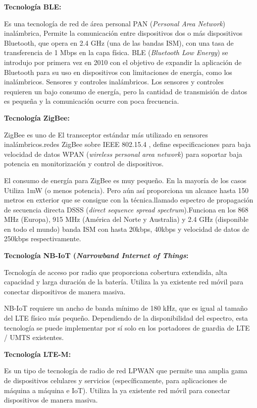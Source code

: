 \textbf{Tecnología BLE:}

Es una tecnología de red de área personal PAN (\textit{Personal Area Network}) inalámbrica, Permite la comunicación entre dispositivos dos o  más dispositivos Bluetooth, que opera en 2.4 GHz (una de las bandas ISM), con una tasa de transferencia de 1 Mbps en la capa física. BLE (\textit{Bluetooth Low Energy}) se introdujo por primera vez en 2010 con el objetivo de expandir la aplicación de Bluetooth para su uso en dispositivos con limitaciones de energía, como los inalámbricos. Sensores y controles inalámbricos. Los sensores y controles requieren un bajo consumo de energía, pero la cantidad de transmisión de datos es pequeña y la comunicación ocurre con poca frecuencia\citep{chang2014bluetooth}.


\textbf{Tecnología ZigBee:}

ZigBee es uno de El transceptor estándar más utilizado en sensores inalámbricos.redes ZigBee sobre IEEE 802.15.4 , define especificaciones para baja velocidad de datos WPAN (\textit{wireless personal area network}) para soportar baja potencia en monitorización y control de dispositivos\citep{ramya2011study}.

El consumo de energía para ZigBee es muy pequeño. En la mayoría de los casos Utiliza 1mW (o menos potencia). Pero aún así proporciona un alcance hasta 150 metros en exterior que se consigue con la técnica.llamado espectro de propagación de secuencia directa DSSS (\textit{direct sequence spread spectrum}).Funciona en los 868 MHz (Europa), 915 MHz (América del Norte y Australia) y 2.4 GHz (disponible en todo el mundo) banda ISM con hasta 20kbps, 40kbps y velocidad de datos de 250kbps respectivamente\citep{ramya2011study}.

\textbf{Tecnología NB-IoT (\textit{Narrowband Internet of Things}:}

Tecnología de acceso por radio que proporciona cobertura extendida, alta capacidad y larga duración de la batería. Utiliza la ya existente red móvil para conectar dispositivos de manera masiva.

NB-IoT requiere un ancho de banda mínimo de 180 kHz, que es igual al tamaño del LTE físico más pequeño.
Dependiendo de la disponibilidad del espectro, esta tecnología se puede implementar por sí solo en los portadores de guardia de LTE / UMTS existentes\citep{adhikary2016performance}.

\textbf{Tecnología LTE-M:}

Es un tipo de tecnología de radio de red LPWAN que permite una amplia gama de dispositivos celulares y servicios (específicamente, para aplicaciones de máquina a máquina e IoT). Utiliza la ya existente red móvil para conectar dispositivos de manera masiva.

